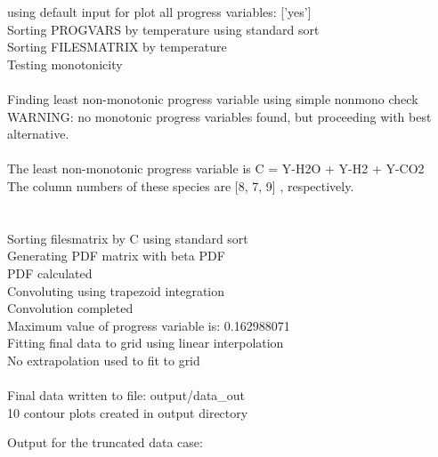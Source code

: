 \documentclass[11pt]{article}
\begin{document}
\hfill\begin{minipage}{\dimexpr\textwidth-3cm}

using default input for plot all progress variables:
['yes'] \\
Sorting PROGVARS by temperature using standard sort \\
Sorting FILESMATRIX by temperature \\
Testing monotonicity  \\
\\
Finding least non-monotonic progress variable using simple nonmono check \\
WARNING: no monotonic progress variables found, but proceeding with best alternative. \\
\\
The least non-monotonic progress variable is C = Y-H2O + Y-H2 + Y-CO2 \\ 
The column numbers of these species are [8, 7, 9] , respectively. \\
\\
\\
Sorting filesmatrix by C using standard sort\\
Generating PDF matrix with beta PDF\\
PDF calculated\\
Convoluting using trapezoid integration\\
Convolution completed\\
Maximum value of progress variable is: 0.162988071\\
Fitting final data to grid using linear interpolation\\
No extrapolation used to fit to grid\\
\\
Final data written to file: output/data\_out \\
10 contour plots created in output directory \\

\xdef\tpd{\the\prevdepth}
\end{minipage}

\vspace{12pt}


\newpage
Output for the truncated data case:
\vspace{12pt}
\end{document}
